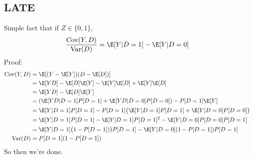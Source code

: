 \documentclass[12pt]{article}
\theoremstyle{plain}
\theoremstyle{definition}
\theoremstyle{remark}
\newcommand{\Cov}{\operatorname{Cov}}
\newcommand{\Var}{\operatorname{Var}}
\begin{document}
\clearpage
\subsection{LATE}


Simple fact that if $Z\in \{0,1\}$,
\begin{align*}
  \frac{%
    \Cov(Y,D)
  }{%
    \Var(D)
  }
  = \E[Y|D=1]-\E[Y|D=0]
\end{align*}
Proof:
\begin{align*}
  \Cov(Y,D)
  &=
  \E[(Y-\E[Y])(D-\E[D])]
  \\
  &=
  \E[YD]
  - \E[D]\E[Y]
  - \E[Y]\E[D]
  + \E[Y]\E[D]
  \\
  &=
  \E[YD] - \E[D]\E[Y]
  \\
  &=
  \left(
  \E[YD|D=1]P[D=1]
  +
  \E[YD|D=0]P[D=0]
  \right)
  - P[D=1]\E[Y]
  \\
  &=
  \E[Y|D=1]P[D=1]
  - P[D=1]
  \big(
  \E[Y|D=1]P[D=1]
  +
  \E[Y|D=0]P[D=0]
  \big)
  \\
  &=
  \E[Y|D=1]P[D=1]
  -
  \E[Y|D=1]P[D=1]^2
  -
  \E[Y|D=0]P[D=0]P[D=1]
  \\
  &=
  \E[Y|D=1]
  \big(1 - P[D=1])\big)P[D=1]
  -
  \E[Y|D=0](1-P[D=1])P[D=1]
  \\
  \Var(D)
  &=
  P[D=1](1-P[D=1])
\end{align*}
So then we're done.
\end{document}

